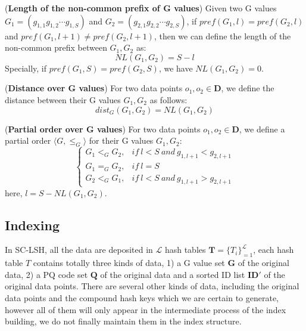 \documentclass[twocolumn]{svjour3}          %
\begin{document}
\begin{definition}
\label{def:gncpl}
(\textbf{Length of the non-common prefix of G values}) Given two G values $G_1=(g_{1,1}g_{1,2}\cdots g_{1,S})$ and $G_2=(g_{2,1}g_{2,2}\cdots g_{2,S})$, if $pref(G_1,l)=pref(G_2,l)$ and $pref(G_1,l+1)\neq pref(G_2, l+1)$, then we can define the length of the non-common prefix between $G_1, G_2$ as:
\begin{equation}
\label{eq:gncpl}
NL(G_1,G_2)=S-l
\end{equation}
Specially, if $pref(G_1,S)=pref(G_2,S)$, we have $NL(G_1,G_2)=0$.
\end{definition}

\begin{definition}
\label{def:gdis}
(\textbf{Distance over G values}) For two data points $o_1, o_2 \in \textbf{D}$, we define the distance between their G values $G_1,G_2$ as follows:
\begin{equation}
\label{eq:gdis}
dist_G(G_1,G_2)=NL(G_1,G_2)
\end{equation}
\end{definition}

\begin{definition}
\label{def:gpartial}
(\textbf{Partial order over G values}) For two data points $o_1, o_2 \in \textbf{D}$, we define a partial order $\langle G, \leq_G \rangle$ for their G values $G_1,G_2$:
\begin{equation}\label{eq:gpartialorder}
\left\{ {\begin{array}{ll}
{G_1<_G G_2,} & {if\ l<S\ and\ g_{1,l+1}<g_{2,l+1}} \\
{G_1=_G G_2,} & {if\ l=S}\\
{G_2<_G G_1,} & {if\ l<S\ and\ g_{1,l+1}>g_{2,l+1}}
\end{array}} \right.
\end{equation}
here, $l=S-NL(G_1,G_2)$.
\end{definition}

\subsection{Indexing}\label{ssec:indexing}
In SC-LSH, all the data are deposited in $\mathcal{L}$ hash tables $\textbf{T}=\{T_i\}_{=1}^{\mathcal{L}}$, each hash table $T$ contains totally three kinds of data, 1) a G value set $\textbf{G}$ of the original data, 2) a PQ code set $\textbf{Q}$ of the original data and a sorted ID list $\textbf{ID}'$ of the original data points. There are several other kinds of data, including the original data points and the compound hash keys which we are certain to generate, however all of them will only appear in the intermediate process of the index building, we do not finally maintain them in the index structure.
\end{document}
